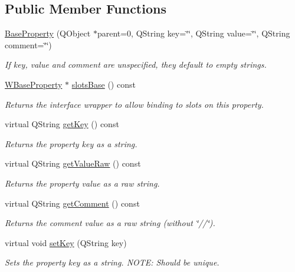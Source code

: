 \subsection*{Public Member Functions}
\begin{DoxyCompactItemize}
\item 
\hyperlink{class_base_property_aca37cc72811875adbb8a5f5f91e521a2}{Base\-Property} (Q\-Object $\ast$parent=0, Q\-String key=\char`\"{}\char`\"{}, Q\-String value=\char`\"{}\char`\"{}, Q\-String comment=\char`\"{}\char`\"{})
\begin{DoxyCompactList}\small\item\em If key, value and comment are unspecified, they default to empty strings. \end{DoxyCompactList}\item 
\hyperlink{class_w_base_property}{W\-Base\-Property} $\ast$ \hyperlink{class_base_property_a032130dea4bd72ee8dd80dcfa7d5f37a}{slots\-Base} () const 
\begin{DoxyCompactList}\small\item\em Returns the interface wrapper to allow binding to slots on this property. \end{DoxyCompactList}\item 
virtual Q\-String \hyperlink{class_base_property_a7b5d5d1009130976d7a53720c6c8dab7}{get\-Key} () const 
\begin{DoxyCompactList}\small\item\em Returns the property key as a string. \end{DoxyCompactList}\item 
virtual Q\-String \hyperlink{class_base_property_a9656d6fa643734ae606fd613349e8f40}{get\-Value\-Raw} () const 
\begin{DoxyCompactList}\small\item\em Returns the property value as a raw string. \end{DoxyCompactList}\item 
virtual Q\-String \hyperlink{class_base_property_a77b2576711cabd4b4f0b39ae79868ebf}{get\-Comment} () const 
\begin{DoxyCompactList}\small\item\em Returns the comment value as a raw string (without \char`\"{}//\char`\"{}). \end{DoxyCompactList}\item 
virtual void \hyperlink{class_base_property_a5ed5f7ca81d54b1506e62ed23db2a8c5}{set\-Key} (Q\-String key)
\begin{DoxyCompactList}\small\item\em Sets the property key as a string. N\-O\-T\-E\-: Should be unique. \end{DoxyCompactList}\item 

\end{DoxyCompactItemize}
